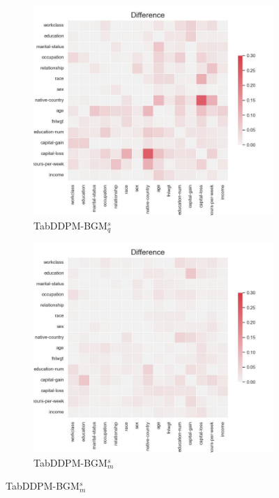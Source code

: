 \begin{figure}[h]
\begin{subfigure}{0.3\textwidth}
    \end{subfigure}
	\begin{subfigure}{0.3\textwidth}
		\includegraphics[width=\textwidth]{images/correlation_difference/tab-ddpm-bgm-simTune.jpg}
		\caption{TabDDPM-BGM$^{s}_q$}

	\end{subfigure}
    \begin{subfigure}{0.3\textwidth}
        \includegraphics[width=\textwidth]{images/correlation_difference/tab-ddpm-bgm-simTune-minmax.jpg}
        \caption{TabDDPM-BGM$^{s}_m$}


\end{subfigure}
\end{figure}
